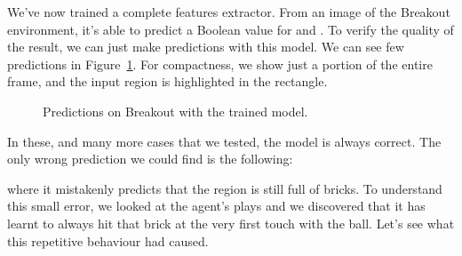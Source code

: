 We've now trained a complete features extractor. From an image of the Breakout
environment, it's able to predict a Boolean value for  and
. To verify the quality of the result, we can just make
predictions with this model. We can see few predictions in
Figure~\ref{fig:breakout-predict}. For compactness, we show just a portion of
the entire frame, and the input region is highlighted in the rectangle.
\begin{figure}
	\centering
	\caption{Predictions on Breakout with the trained model.}
	\label{fig:breakout-predict}
\end{figure}

In these, and many more cases that we tested, the model is always correct. The
only wrong prediction we could find is the following:
\begin{center}
\end{center}
where it mistakenly predicts that the region is still full of bricks. To
understand this small error, we looked at the agent's plays and we discovered
that it has learnt to always hit that brick at the very first touch with the
ball. Let's see what this repetitive behaviour had caused.

